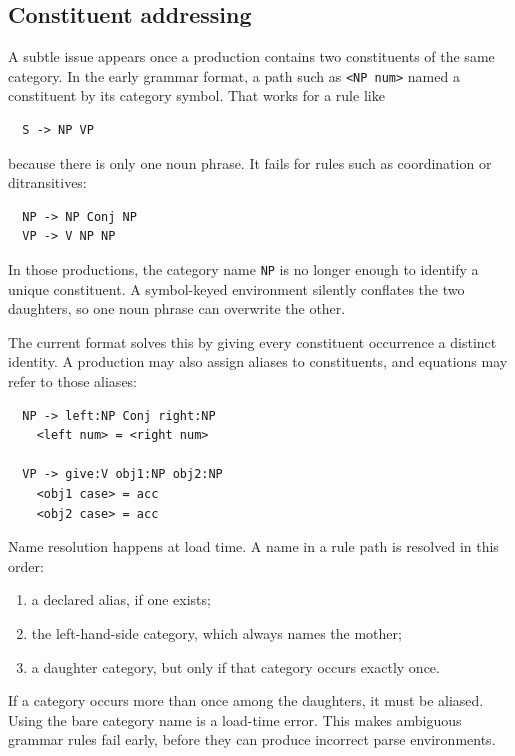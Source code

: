 \documentclass[11pt]{article}
\theoremstyle{definition}
\theoremstyle{plain}
\theoremstyle{remark}
\begin{document}
\subsection{Constituent addressing}
\label{sec:constituent-addressing}

A subtle issue appears once a production contains two constituents of the same
category. In the early grammar format, a path such as \texttt{<NP num>} named a
constituent by its category symbol. That works for a rule like

\begin{verbatim}
  S -> NP VP
\end{verbatim}

because there is only one noun phrase. It fails for rules such as coordination
or ditransitives:

\begin{verbatim}
  NP -> NP Conj NP
  VP -> V NP NP
\end{verbatim}

In those productions, the category name \texttt{NP} is no longer enough to
identify a unique constituent. A symbol-keyed environment silently conflates the
two daughters, so one noun phrase can overwrite the other.

The current format solves this by giving every constituent occurrence a distinct
identity. A production may also assign aliases to constituents, and equations
may refer to those aliases:

\begin{verbatim}
  NP -> left:NP Conj right:NP
    <left num> = <right num>

  VP -> give:V obj1:NP obj2:NP
    <obj1 case> = acc
    <obj2 case> = acc
\end{verbatim}

Name resolution happens at load time. A name in a rule path is resolved in this
order:
\begin{enumerate}
  \item a declared alias, if one exists;
  \item the left-hand-side category, which always names the mother;
  \item a daughter category, but only if that category occurs exactly once.
\end{enumerate}

If a category occurs more than once among the daughters, it must be aliased.
Using the bare category name is a load-time error. This makes ambiguous grammar
rules fail early, before they can produce incorrect parse environments.
\end{document}
